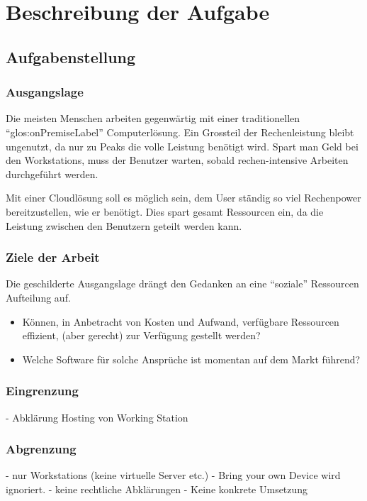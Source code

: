 \chapter{Beschreibung der Aufgabe}

\section{Aufgabenstellung}


\subsection{Ausgangslage}
Die meisten Menschen arbeiten gegenwärtig mit einer traditionellen "`\gls{glos:onPremiseLabel}"' Computerlösung.
Ein Grossteil der Rechenleistung bleibt ungenutzt, da nur zu Peaks die volle Leistung benötigt wird.
Spart man Geld bei den Workstations, muss der Benutzer warten, sobald rechen-intensive Arbeiten durchgeführt werden.

Mit einer Cloudlösung soll es möglich sein, dem User ständig so viel Rechenpower bereitzustellen, wie er benötigt.
Dies spart gesamt Ressourcen ein, da die Leistung zwischen den Benutzern geteilt werden kann.

\subsection{Ziele der Arbeit}
Die geschilderte Ausgangslage drängt den Gedanken an eine “soziale” Ressourcen Aufteilung auf.

\begin{itemize}
	\item Können, in Anbetracht von Kosten und Aufwand, verfügbare Ressourcen effizient, (aber gerecht) zur Verfügung gestellt werden?
	\item Welche Software für solche Ansprüche ist momentan auf dem Markt führend?
\end{itemize}


\subsection{Eingrenzung}
- Abklärung Hosting von Working Station

\subsection{Abgrenzung}
- nur Workstations (keine virtuelle Server etc.)
- Bring your own Device wird ignoriert.
- keine rechtliche Abklärungen
- Keine konkrete Umsetzung
